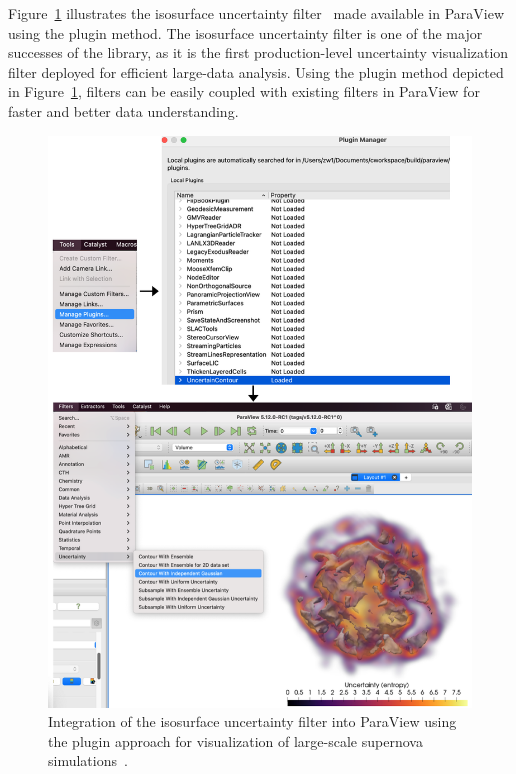 Figure~\ref{fig:uncertainty-plugin} illustrates the \vtkm isosurface uncertainty filter~\cite{Wang2023, Athawale21} made available in ParaView using the plugin method. The isosurface uncertainty filter is one of the major successes of the \vtkm library, as it is the first production-level uncertainty visualization filter deployed for efficient large-data analysis. Using the plugin method depicted in Figure~\ref{fig:uncertainty-plugin}, \vtkm filters can be easily coupled with existing filters in ParaView for faster and better data understanding.       

\begin{figure}[htb]
  \includegraphics[width=\linewidth]{figures/isosurfaceUncertaintyPlugin.png}
  \caption{Integration of the \vtkm isosurface uncertainty filter into ParaView using the plugin approach for visualization of large-scale supernova simulations~\cite{Sandoval2021}.}
  \label{fig:uncertainty-plugin}
\end{figure}



